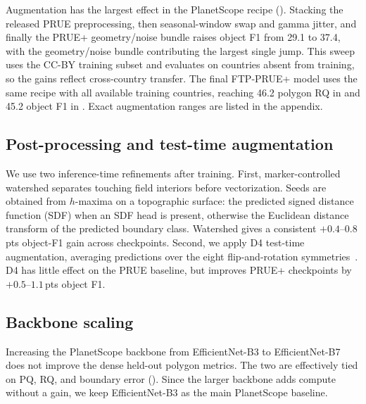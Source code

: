 \documentclass[10pt,twocolumn,letterpaper]{article}
\begin{document}
Augmentation has the largest effect in the PlanetScope recipe (). Stacking the released PRUE preprocessing, then seasonal-window swap and gamma jitter, and finally the PRUE+ geometry/noise bundle raises object F1 from 29.1 to 37.4, with the geometry/noise bundle contributing the largest single jump. This sweep uses the CC-BY training subset and evaluates on countries absent from training, so the gains reflect cross-country transfer. The final FTP-PRUE+ model uses the same recipe with all available training countries, reaching 46.2 polygon RQ in  and 45.2 object F1 in . Exact augmentation ranges are listed in the appendix.


\subsection{Post-processing and test-time augmentation}
We use two inference-time refinements after training. First, marker-controlled watershed separates touching field interiors before vectorization. Seeds are obtained from $h$-maxima on a topographic surface: the predicted signed distance function (SDF) when an SDF head is present, otherwise the Euclidean distance transform of the predicted boundary class. Watershed gives a consistent $+0.4$--$0.8$\,pts object-F1 gain across checkpoints. Second, we apply D4 test-time augmentation, averaging predictions over the eight flip-and-rotation symmetries~\cite{wang2019tta,moshkov2020tta}. D4 has little effect on the PRUE baseline, but improves PRUE+ checkpoints by $+0.5$--$1.1$\,pts object F1.

\begin{table}[t]
    \centering
    \caption{\textbf{Real 3m imagery outperforms Sentinel-2 upsampling across field sizes.}
    PQ is scored against the true FTW polygons under each row's output-grid
    protocol. Upsampling Sentinel-2 recovers part of the small/medium gap, but
    real $3$m pixels lead at every size.}
    \label{tab:resolution_ablation}
    
\end{table}

\subsection{Backbone scaling}
Increasing the PlanetScope backbone from EfficientNet-B3 to EfficientNet-B7 does not improve the dense held-out polygon metrics. The two are effectively tied on PQ, RQ, and boundary error (). Since the larger backbone adds compute without a gain, we keep EfficientNet-B3 as the main PlanetScope baseline.
\end{document}
